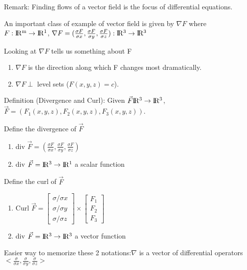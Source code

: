 \documentclass{article}
\newcommand{\R}{\rm I\!R}
\begin{document}
        Remark: Finding flows of a vector field is the focus of differential equations.
        
        An important class of example of vector field is given by $\nabla F$ where $F:\R^m\rightarrow\R^1$, $\nabla F=(\frac{\sigma F}{\sigma x},\frac{\sigma F}{\sigma y},\frac{\sigma F}{\sigma z}):\R^3\rightarrow\R^3$
        
        Looking at $\nabla F$ tells us something about F
        \begin{enumerate}
            \item $\nabla F$ is the direction along which F changes most dramatically.
            \item $\nabla F \perp$ level sets ($F(x,y,z) = c$).
        \end{enumerate}
        Definition (Divergence and Curl): Given $\vec{F}\R^3\rightarrow \R^3$, $\vec{F} = (F_1(x,y,z),F_2(x,y,z),F_3(x,y,z))$. 
        
        Define the divergence of $\vec{F}$
        \begin{enumerate}
            \item div $\vec{F} = (\frac{\sigma F}{\sigma x},\frac{\sigma F}{\sigma y},\frac{\sigma F}{\sigma z})$
            \item div $\vec{F} = \R^3\rightarrow \R^1$ a scalar function
        \end{enumerate}
        Define the curl of $\vec{F}$
        \begin{enumerate}
            \item Curl $\vec{F} = \left[\begin{array}{c}
                \sigma/\sigma x  \\
                \sigma/\sigma y  \\
                \sigma/\sigma z  
            \end{array}\right] \times \left[\begin{array}{c}
                F_1  \\
                F_2  \\
                F_3  
            \end{array}\right]$
            \item div $\vec{F} = \R^3\rightarrow \R^3$ a vector function
        \end{enumerate}
        Easier way to memorize these 2 notations:$\nabla$ is a vector of differential operators $<\frac{\sigma }{\sigma x},\frac{\sigma }{\sigma y},\frac{\sigma }{\sigma z}>$
        
\end{document}
